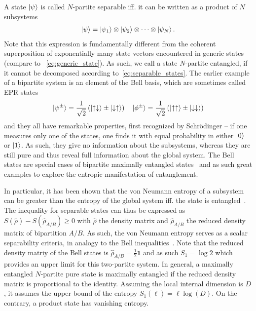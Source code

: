 A state $\ket{\psi}$ is called $N$-partite separable iff. it can be written as a product of $N$ subsystems~\cite{Horodecki2009}
\begin{align}
    \ket{\psi} = \ket{\psi_1}\otimes\ket{\psi_2}\otimes\dots\otimes\ket{\psi_N}.
    \label{eq:separable_states}
\end{align}
Note that this expression is fundamentally different from the coherent superposition of exponentially many state vectors encountered in generic states (compare to ~\cref{eq:generic_state}).
As such, we call a state $N$-partite entangled, if it cannot be decomposed according to~\cref{eq:separable_states}.
The earlier example of a bipartite system is an element of the Bell basis, which are sometimes called EPR states
\begin{align}
    \ket{\psi^\pm}=\frac 1{\sqrt2}\left( \ket{\uparrow\downarrow}\pm\ket{\downarrow\uparrow} \right)
    \quad
    \ket{\phi^\pm}=\frac 1{\sqrt2}\left( \ket{\uparrow\uparrow}\pm\ket{\downarrow\downarrow} \right)
\end{align}
and they all have remarkable properties, first recognized by Schrödinger -- if one measures only one of the states, one finds it with equal probability in either $\ket{0}$ or $\ket{1}$.
As such, they give no information about the subsystems, whereas they are still pure and thus reveal full information about the global system.
The Bell states are special cases of bipartite maximally entangled states~\cite{Horodecki2009} and as such great examples to explore the entropic manifestation of entanglement.

In particular, it has been shown that the von Neumann entropy of a subsystem can be greater than the entropy of the global system iff. the state is entangled~\cite{Horodecki1994}.
The inequality for separable states can thus be expressed as $S(\hat\rho)-S(\hat\rho_{A/B})\geq0$ with $\hat\rho$ the density matrix and $\hat\rho_{A/B}$ the reduced density matrix of bipartition $A/B$.
As such, the von Neumann entropy serves as a scalar separability criteria, in analogy to the Bell inequalities~\cite{Horodecki2006}.
Note that the reduced density matriy of the Bell states is $\hat\rho_{A/B}=\frac12\mathbb1$ and as such $S_1=\log2$ which provides an upper limit for this two-partite system.
In general, a maximally entangled $N$-partite pure state is maximally entangled if the reduced density matrix is proportional to the identity.
Assuming the local internal dimension is $D$, it assumes the upper bound of the entropy $S_1(\ell)=\ell\log(D)$.
On the contrary, a product state has vanishing entropy.

